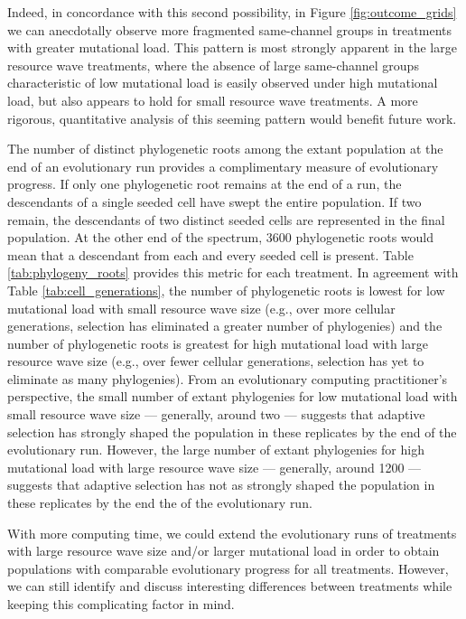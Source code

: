 

Indeed, in concordance with this second possibility, in Figure \ref{fig:outcome_grids} we can anecdotally observe more fragmented same-channel groups in treatments with greater mutational load.
This pattern is most strongly apparent in the large resource wave treatments, where the absence of large same-channel groups characteristic of low mutational load is easily observed under high mutational load, but also appears to hold for small resource wave treatments.
A more rigorous, quantitative analysis of this seeming pattern would benefit future work.



The number of distinct phylogenetic roots among the extant population at the end of an evolutionary run provides a complimentary measure of evolutionary progress.
If only one phylogenetic root remains at the end of a run, the descendants of a single seeded cell have swept the entire population.
If two remain, the descendants of two distinct seeded cells are represented in the final population.
At the other end of the spectrum, 3600 phylogenetic roots would mean that a descendant from each and every seeded cell is present.
Table \ref{tab:phylogeny_roots} provides this metric for each treatment.
In agreement with Table \ref{tab:cell_generations}, the number of phylogenetic roots is lowest for low mutational load with small resource wave size (e.g., over more cellular generations, selection has eliminated a greater number of phylogenies) and the number of phylogenetic roots is greatest for high mutational load with large resource wave size (e.g., over fewer cellular generations, selection has yet to eliminate as many phylogenies).
From an evolutionary computing practitioner's perspective, the small number of extant phylogenies for low mutational load with small resource wave size --- generally, around two --- suggests that adaptive selection has strongly shaped the population in these replicates by the end of the evolutionary run.
However, the large number of extant phylogenies for high mutational load with large resource wave size --- generally, around 1200 --- suggests that adaptive selection has not as strongly shaped the population in these replicates by the end the of the evolutionary run.

With more computing time, we could extend the evolutionary runs of treatments with large resource wave size and/or larger mutational load in order to obtain populations with comparable evolutionary progress for all treatments.
However, we can still identify and discuss interesting differences between treatments while keeping this complicating factor in mind.


